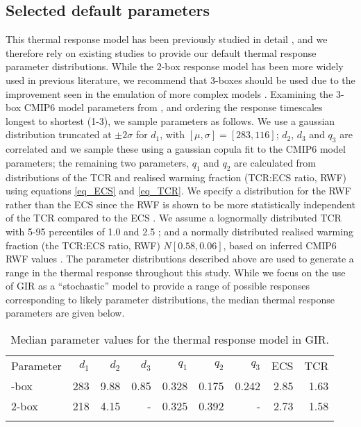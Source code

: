 \documentclass[gmd, manuscript]{copernicus}
\begin{document}
\subsection*{Selected default parameters}
This thermal response model has been previously studied in detail \citep{Geoffroy2013,Geoffroy2013a,Gregory2015,Smith2017}, and we therefore rely on existing studies to provide our default thermal response parameter distributions. While the 2-box response model has been more widely used in previous literature, we recommend that 3-boxes should be used due to the improvement seen in the emulation of more complex models \citep{Tsutsui2017}.  Examining the 3-box CMIP6 model parameters from \cite{Tsutsui2019}, and ordering the response timescales longest to shortest (1-3), we sample parameters as follows. We use a gaussian distribution truncated at $\pm2\sigma$ for $d_1$, with $[\mu,\sigma] = [283 , 116]$; $d_2$, $d_3$ and $q_3$ are correlated and we sample these using a gaussian copula fit to the CMIP6 model parameters; the remaining two parameters, $q_1$ and $q_2$ are calculated from distributions of the TCR and realised warming fraction (TCR:ECS ratio, RWF) using equations \ref{eq_ECS} and \ref{eq_TCR}. We specify a distribution for the RWF rather than the ECS since the RWF is shown to be more statistically independent of the TCR compared to the ECS \citep{Millar2015}. We assume a lognormally distributed TCR with 5-95 percentiles of 1.0 and 2.5 \citep{Collins2013}; and a normally distributed realised warming fraction (the TCR:ECS ratio, RWF) $N[0.58 , 0.06]$, based on inferred CMIP6 RWF values \citep{Tsutsui2019}. The parameter distributions described above are used to generate a range in the thermal response throughout this study. While we focus on the use of GIR as a ``stochastic'' model to provide a range of possible responses corresponding to likely parameter distributions, the median thermal response parameters are given below.

\begin{table}[t]
    \caption{Median parameter values for the thermal response model in GIR.} \label{tab:thermparameters}
    \begin{tabular}{l r r r r r r r r}
    \tophline
    Parameter & $d_1$ & $d_2$ & $d_3$ & $q_1$ & $q_2$ & $q_3$ & ECS & TCR\\
    \middlehline
    3-box & 283 & 9.88 & 0.85 & 0.328 & 0.175 & 0.242 & 2.85 & 1.63 \\
    2-box & 218 &  4.15 & - & 0.325 & 0.392 & - & 2.73 & 1.58 \\
    \bottomhline
    \end{tabular}
    \belowtable{} %
\end{table}
\end{document}
